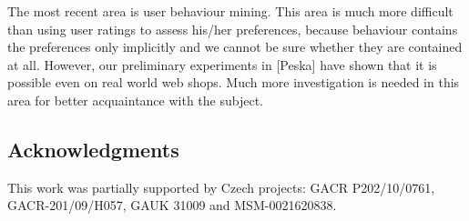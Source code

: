 \documentclass[runningheads,a4paper]{llncs}
\begin{document}
The most recent area is user behaviour mining. This area is much more difficult than using user ratings to assess his/her preferences, because behaviour contains the preferences only implicitly and we cannot be sure whether they are contained at all. However, our preliminary experiments in [Peska] have shown that it is possible even on real world web shops. Much more investigation is needed in this area for better acquaintance with the subject. 




\subsection*{Acknowledgments}
This work was partially supported by Czech projects: GACR P202/10/0761, GACR-201/09/H057, GAUK 31009 and MSM-0021620838.



\end{document}

